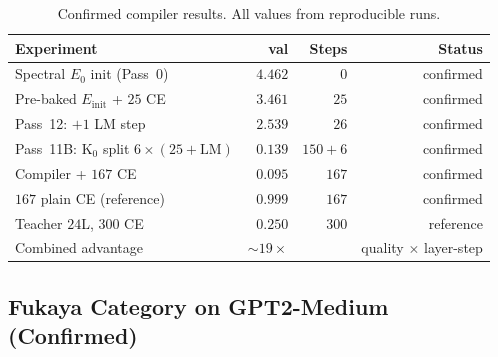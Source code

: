 \documentclass[11pt]{amsart}
\begin{document}
\begin{table}[htbp]
\centering\small
\caption{Confirmed compiler results. All values from reproducible runs.}
\label{tab:performance}
\begin{tabular}{lrrr}
\toprule
\textbf{Experiment} & \textbf{val} & \textbf{Steps} & \textbf{Status} \\
\midrule
Spectral $E_0$ init (Pass~0)             & $4.462$  & $0$    & confirmed \\
Pre-baked $E_\mathrm{init}$ + $25$ CE    & $3.461$  & $25$   & confirmed \\
Pass~12: $+1$ LM step                    & $2.539$  & $26$   & confirmed \\
Pass~11B: K$_0$ split $6\times(25+\mathrm{LM})$ & $0.139$ & $150+6$ & confirmed \\
Compiler + $167$ CE                      & $0.095$  & $167$  & confirmed \\
$167$ plain CE (reference)               & $0.999$  & $167$  & confirmed \\
Teacher $24$L, $300$ CE                  & $0.250$  & $300$  & reference \\
\midrule
Combined advantage                       & $\sim\!19\times$ & & quality $\times$ layer-step \\
\bottomrule
\end{tabular}
\end{table}

\subsection{Fukaya Category on GPT2-Medium (Confirmed)}
\end{document}

